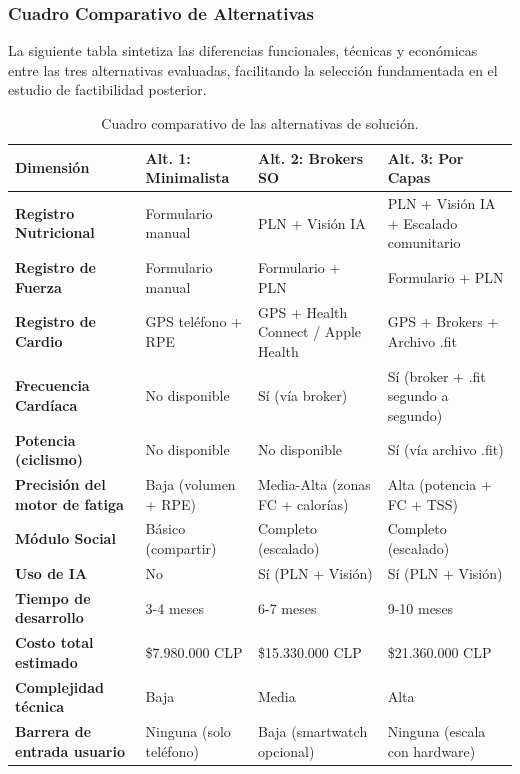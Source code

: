 \documentclass[12pt]{article}
\begin{document}
\subsubsection{Cuadro Comparativo de Alternativas}
La siguiente tabla sintetiza las diferencias funcionales, técnicas y económicas entre las tres alternativas evaluadas, facilitando la selección fundamentada en el estudio de factibilidad posterior.

\begin{table}[h!]
    \centering
    \renewcommand{\arraystretch}{1.4}
    \begin{tabular}{|m{3.8cm}|m{3.5cm}|m{3.5cm}|m{3.8cm}|}
        \hline
        \rowcolor[HTML]{EFEFEF}
        \textbf{Dimensión} & \textbf{Alt. 1: Minimalista} & \textbf{Alt. 2: Brokers SO} & \textbf{Alt. 3: Por Capas} \\ \hline
        \textbf{Registro Nutricional} & Formulario manual & PLN + Visión IA & PLN + Visión IA + Escalado comunitario \\ \hline
        \textbf{Registro de Fuerza} & Formulario manual & Formulario + PLN & Formulario + PLN \\ \hline
        \textbf{Registro de Cardio} & GPS teléfono + RPE & GPS + Health Connect / Apple Health & GPS + Brokers + Archivo .fit \\ \hline
        \textbf{Frecuencia Cardíaca} & No disponible & Sí (vía broker) & Sí (broker + .fit segundo a segundo) \\ \hline
        \textbf{Potencia (ciclismo)} & No disponible & No disponible & Sí (vía archivo .fit) \\ \hline
        \textbf{Precisión del motor de fatiga} & Baja (volumen + RPE) & Media-Alta (zonas FC + calorías) & Alta (potencia + FC + TSS) \\ \hline
        \textbf{Módulo Social} & Básico (compartir) & Completo (escalado) & Completo (escalado) \\ \hline
        \textbf{Uso de IA} & No & Sí (PLN + Visión) & Sí (PLN + Visión) \\ \hline
        \textbf{Tiempo de desarrollo} & 3-4 meses & 6-7 meses & 9-10 meses \\ \hline
        \textbf{Costo total estimado} & \$7.980.000 CLP & \$15.330.000 CLP & \$21.360.000 CLP \\ \hline
        \textbf{Complejidad técnica} & Baja & Media & Alta \\ \hline
        \textbf{Barrera de entrada usuario} & Ninguna (solo teléfono) & Baja (smartwatch opcional) & Ninguna (escala con hardware) \\ \hline
    \end{tabular}
    \caption{Cuadro comparativo de las alternativas de solución.}
    \label{tab:comparativa_alternativas}
\end{table}
\newpage
\end{document}
